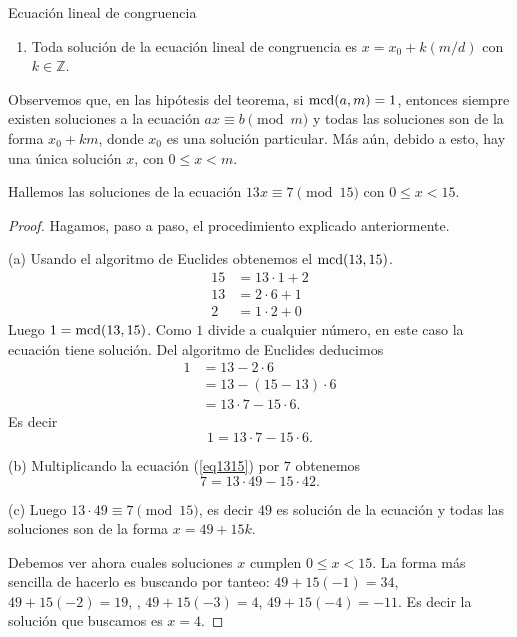 \begin{section}{Ecuación lineal de congruencia}
\begin{enumerate}[label=(\alph*)]
Luego $x_0 = rt$ es solución de la ecuación lineal de congruencia. 
\item  Toda solución de la ecuación lineal de congruencia es $x= x_0+ k(m/d)$ con $k \in \mathbb Z$.
\end{enumerate}


Observemos que, en las hipótesis del teorema, si $\operatorname{mcd}(a,m) =1$, entonces siempre existen soluciones a la ecuación $ax\equiv b\pmod m$ y todas las soluciones son de la forma $x_0+km$, donde $x_0$ es una solución particular. Más aún, debido a esto, hay una única solución $x$, con $ 0\le x < m$. 



\begin{ejemplo} Hallemos las soluciones de la ecuación $13x\equiv 7 \pmod{15}$ con $0\le x< 15$.
\end{ejemplo}
\begin{proof}
Hagamos, paso a paso, el procedimiento explicado anteriormente.

(a) 
Usando  el algoritmo de Euclides obtenemos el  $\operatorname{mcd}(13,15)$.
\begin{align*}
15 &=  13 \cdot 1 + 2 \\
13 &= 2 \cdot 6 + 1 \\
2 &= 1 \cdot 2 + 0
\end{align*}
Luego $1 = \operatorname{mcd}(13,15)$. Como $1$ divide a cualquier número, en este caso  la ecuación tiene solución. Del algoritmo de Euclides deducimos 
\begin{align*}
1 &= 13 - 2 \cdot 6\\
&= 13 - (15-13) \cdot 6  \\
&= 13\cdot 7 - 15\cdot 6. 
\end{align*}
Es decir
\begin{equation}\label{eq1315}
1 = 13\cdot 7 - 15\cdot 6. 
\end{equation}

(b) Multiplicando la ecuación (\ref{eq1315}) por $7$ obtenemos
$$
7 = 13\cdot 49 - 15\cdot 42. 
$$


(c) Luego $13 \cdot 49 \equiv 7 \pmod{15}$, es decir $49$ es solución de la ecuación y todas las soluciones son de la forma 
 $x=49 + 15k$.

Debemos ver ahora cuales soluciones $x$ cumplen $0\le x< 15$. La forma más sencilla de hacerlo es buscando por tanteo: $49+15(-1)=34$, $49+15(-2)=19$, , $49+15(-3)=4$, $49+15(-4)=-11$.
Es decir la solución que buscamos es $x=4$.  
\end{proof}





\end{section}
